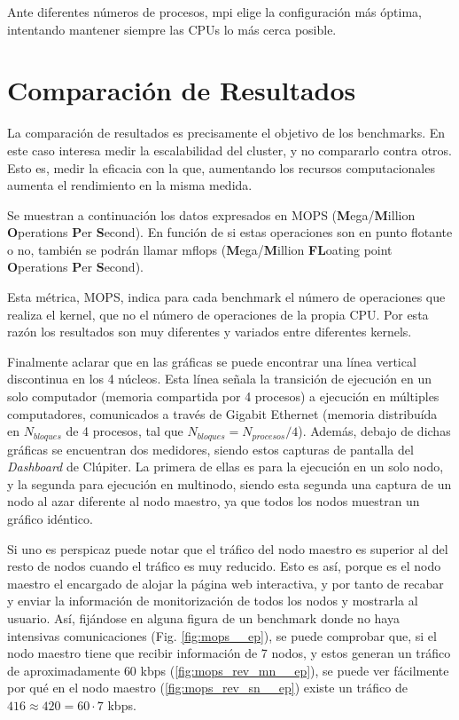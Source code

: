 Ante diferentes números de procesos, \acrshort{mpi} elige la configuración más óptima, intentando mantener siempre las CPUs lo más cerca posible.

\section{Comparación de Resultados}
\label{sec:comparacion_resultados}
La comparación de resultados es precisamente el objetivo de los benchmarks. En este caso interesa medir la escalabilidad del cluster, y no compararlo contra otros. Esto es, medir la eficacia con la que, aumentando los recursos computacionales aumenta el rendimiento en la misma medida.

Se muestran a continuación los datos expresados en MOPS (\textbf{M}ega/\textbf{M}illion \textbf{O}perations \textbf{P}er \textbf{S}econd). En función de si estas operaciones son en punto flotante o no, también se podrán llamar \acrshort{mflops} (\textbf{M}ega/\textbf{M}illion \textbf{FL}oating point \textbf{O}perations \textbf{P}er \textbf{S}econd).

Esta métrica, MOPS, indica para cada benchmark el número de operaciones que realiza el kernel, que no el número de operaciones de la propia CPU. Por esta razón los resultados son muy diferentes y variados entre diferentes kernels. \cite[V. Performance Evaluation: B. NPB Kernels Performance on the Gigabit Ethernet cluster]{mallon2009npb}

Finalmente aclarar que en las gráficas se puede encontrar una línea vertical discontinua en los 4 núcleos. Esta línea señala la transición de ejecución en un solo computador (memoria compartida por 4 procesos) a ejecución en múltiples computadores, comunicados a través de Gigabit Ethernet (memoria distribuída en $N_{bloques}$ de 4 procesos, tal que $N_{bloques} = N_{procesos} / 4$). Además, debajo de dichas gráficas se encuentran dos medidores, siendo estos capturas de pantalla del \textit{Dashboard} de Clúpiter. La primera de ellas es para la ejecución en un solo nodo, y la segunda para ejecución en multinodo, siendo esta segunda una captura de un nodo al azar diferente al nodo maestro, ya que todos los nodos muestran un gráfico idéntico.

Si uno es perspicaz puede notar que el tráfico del nodo maestro es superior al del resto de nodos cuando el tráfico es muy reducido. Esto es así, porque es el nodo maestro el encargado de alojar la página web interactiva, y por tanto de recabar y enviar la información de monitorización de todos los nodos y mostrarla al usuario. Así, fijándose en alguna figura de un benchmark donde no haya intensivas comunicaciones (Fig. \ref{fig:mops__ep}), se puede comprobar que, si el nodo maestro tiene que recibir información de 7 nodos, y estos generan un tráfico de aproximadamente $60$ kbps (\ref{fig:mops_rev_mn__ep}), se puede ver fácilmente por qué en el nodo maestro (\ref{fig:mops_rev_sn__ep}) existe un tráfico de $416 \approx 420 = 60 \cdot 7$ kbps.

